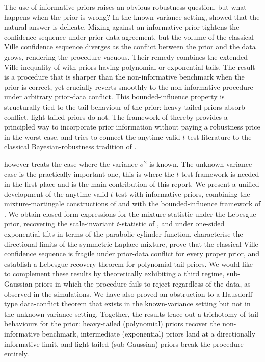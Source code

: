 \documentclass[12pt, a4paper]{report}
\newcommand{\1}{\mathbf{1}}
\begin{document}
The use of informative priors raises an obvious robustness question, but
what happens when the prior is wrong? In the known-variance setting,
\cite{Cortinovis2025} showed that the natural answer is delicate. Mixing
against an informative prior tightens the confidence sequence under
prior-data agreement, but the volume of the classical Ville confidence
sequence diverges as the conflict between the prior and the data
grows, rendering the procedure vacuous. Their remedy combines the
extended Ville inequality of \cite{wang2025extended} with priors having
polynomial or exponential tails. The result is a procedure that is
sharper than the non-informative benchmark when the prior is correct,
yet crucially reverts smoothly to the non-informative procedure
under arbitrary prior-data conflict. This bounded-influence property is structurally tied to the tail behaviour of the prior: heavy-tailed priors absorb conflict, light-tailed priors do not. The
framework of \cite{Cortinovis2025} thereby provides a principled way to
incorporate prior information without paying a robustness price in the
worst case, and tries to connect the anytime-valid \(t\)-test literature to
the classical Bayesian-robustness tradition of \cite{Dawid1973, PericchiSmith1992, PericchiSanso1995, Berger1980}.

\cite{Cortinovis2025} however treats the case where the variance \(\sigma^2\) is
known. The unknown-variance case is the practically important one, this is where the \(t\)-test framework is needed in the first place and is the main contribution of this report. We present a unified development of the anytime-valid \(t\)-test with informative priors, combining the mixture-martingale constructions of \cite{Lai1976} and \cite{Wang2025} with the bounded-influence framework of \cite{Cortinovis2025}. We obtain closed-form expressions for the mixture statistic under the Lebesgue prior, recovering the scale-invariant \(t\)-statistic of \cite{Lai1976}, and under one-sided exponential tilts in terms of the parabolic cylinder function, characterise the directional limits of the symmetric Laplace mixture, prove that the classical Ville confidence sequence is fragile under prior-data conflict for every proper prior, and establish a Lebesgue-recovery theorem for polynomial-tail priors. We would like to complement these results by theoretically exhibiting a third regime, sub-Gaussian priors in which the procedure fails to reject regardless of the data, as observed in the simulations. We have also proved an obstruction to a Hausdorff-type data-conflict theorem that exists in the known-variance setting but not in the
unknown-variance setting. Together, the results trace out a trichotomy of tail behaviours for the prior: heavy-tailed (polynomial) priors recover the non-informative benchmark, intermediate (exponential) priors land at a directionally informative limit, and light-tailed (sub-Gaussian) priors break the procedure entirely.
\end{document}
